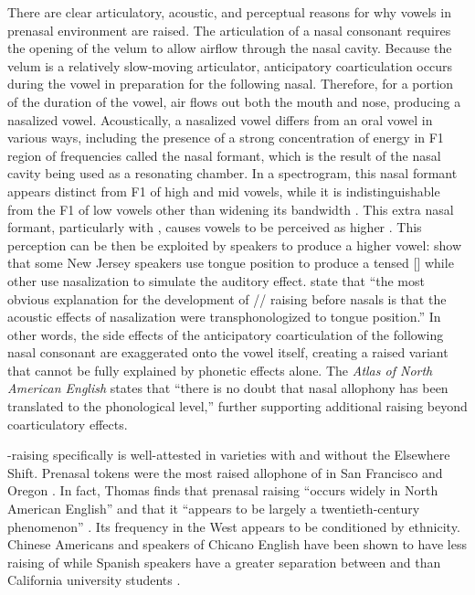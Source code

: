 There are clear articulatory, acoustic, and perceptual reasons for why vowels in prenasal environment are raised. The articulation of a nasal consonant requires the opening of the velum to allow airflow through the nasal cavity. Because the velum is a relatively slow-moving articulator, anticipatory coarticulation occurs during the vowel in preparation for the following nasal. Therefore, for a portion of the duration of the vowel, air flows out both the mouth and nose, producing a nasalized vowel. Acoustically, a nasalized vowel differs from an oral vowel in various ways, including the presence of a strong concentration of energy in F1 region of frequencies called the nasal formant, which is the result of the nasal cavity being used as a resonating chamber. In a spectrogram, this nasal formant appears distinct from F1 of high and mid vowels, while it is indistinguishable from the F1 of low vowels other than widening its bandwidth \citep[193--194]{olive_etal_1993}. This extra nasal formant, particularly with \trap, causes vowels to be perceived as higher \citet{wright_1975}. This perception can be then be exploited by speakers to produce a higher vowel: \citet{dedecker_nycz_2012} show that some New Jersey speakers use tongue position to produce a tensed [\textipa{\ae}] while other use nasalization to simulate the auditory effect. \citet[334]{mielke_etal_2017} state that ``the most obvious explanation for the development of /\textipa{\ae}/ raising before nasals is that the acoustic effects of nasalization were transphonologized to tongue position.'' In other words, the side effects of the anticipatory coarticulation of the following nasal consonant are exaggerated onto the vowel itself, creating a raised variant that cannot be fully explained by phonetic effects alone. The \textit{Atlas of North American English} states that ``there is no doubt that nasal allophony has been translated to the phonological level,'' \citep[175]{labov_ash_boberg_2006_anae}  further supporting additional raising beyond coarticulatory effects.

\ban-raising specifically is well-attested in varieties with and without the Elsewhere Shift. Prenasal tokens were the most raised allophone of \trap in San Francisco \citep[43]{cardoso_etal_2016_pads} and Oregon \citep{becker_etal_2016_pads}. In fact, Thomas finds that prenasal raising ``occurs widely in North American English'' and that it ``appears to be largely a twentieth-century phenomenon'' \citeyearpar[52]{thomas_2001}. Its frequency in the West appears to be conditioned by ethnicity. Chinese Americans \citep[43]{cardoso_etal_2016_pads} and speakers of Chicano English \citep[34]{eckert_2008} have been shown to have less raising of \ban while Spanish speakers have a greater separation between \bat and \ban than California university students \citep{holland_2014_diss}.

